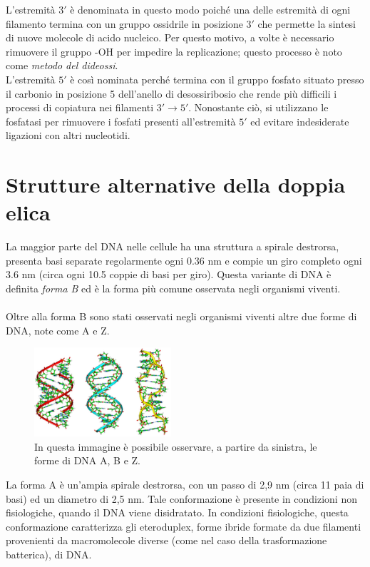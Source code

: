 \documentclass[11pt]{report}
\begin{document}
	L'estremità $3'$ è denominata in questo modo poiché una delle estremità di ogni filamento termina con un gruppo ossidrile in posizione $3'$ che permette la sintesi di nuove molecole di acido nucleico. Per questo motivo, a volte è necessario rimuovere il gruppo -OH per impedire la replicazione; questo processo è noto come \textit{metodo del dideossi}.\\
	
	L'estremità $5'$ è così nominata perché termina con il gruppo fosfato situato presso il carbonio in posizione 5 dell'anello di desossiribosio che rende più difficili i processi di copiatura nei filamenti $3' \rightarrow 5'$. Nonostante ciò, si utilizzano le fosfatasi per rimuovere i fosfati presenti all'estremità $5'$ ed evitare indesiderate ligazioni con altri nucleotidi.
	
	\section{Strutture alternative della doppia elica}
	
	La maggior parte del DNA nelle cellule ha una struttura a spirale destrorsa, presenta basi separate regolarmente ogni 0.36 nm e compie un giro completo ogni 3.6 nm (circa ogni 10.5 coppie di basi per giro). Questa variante di DNA è definita \textit{forma B} ed è la forma più comune osservata negli organismi viventi.\\
	\\
	
	Oltre alla forma B sono stati osservati negli organismi viventi altre due forme di DNA, note come A e Z.\cite{lodish2008molecular}
	
	\begin{figure}
		\includegraphics[width=2in]{formeDNA.png}
		\caption{{\small In questa immagine è possibile osservare, a partire da sinistra, le forme di DNA A, B e Z.}}
	\end{figure}
	
	La forma A è un'ampia spirale destrorsa, con un passo di 2,9 nm (circa 11 paia di basi) ed un diametro di 2,5 nm. Tale conformazione è presente in condizioni non fisiologiche, quando il DNA viene disidratato. In condizioni fisiologiche, questa conformazione caratterizza gli eteroduplex, forme ibride formate da due filamenti provenienti da macromolecole diverse (come nel caso della trasformazione batterica), di DNA.
	
\end{document}
